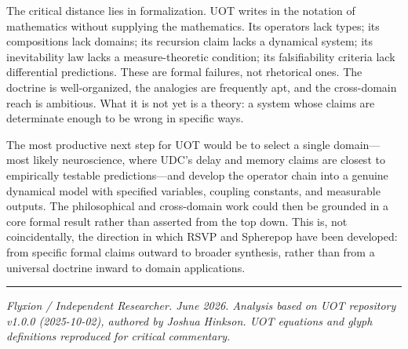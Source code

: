 \documentclass[12pt, oneside]{article}
\theoremstyle{plain-remark}
\begin{document}
The critical distance lies in formalization. UOT writes in the notation of mathematics
without supplying the mathematics. Its operators lack types; its compositions lack domains;
its recursion claim lacks a dynamical system; its inevitability law lacks a
measure-theoretic condition; its falsifiability criteria lack differential predictions.
These are formal failures, not rhetorical ones. The doctrine is well-organized, the
analogies are frequently apt, and the cross-domain reach is ambitious. What it is not
yet is a theory: a system whose claims are determinate enough to be wrong in specific ways.

The most productive next step for UOT would be to select a single domain---most likely
neuroscience, where UDC's delay and memory claims are closest to empirically testable
predictions---and develop the operator chain into a genuine dynamical model with specified
variables, coupling constants, and measurable outputs. The philosophical and cross-domain
work could then be grounded in a core formal result rather than asserted from the top down.
This is, not coincidentally, the direction in which RSVP and Spherepop have been developed:
from specific formal claims outward to broader synthesis, rather than from a universal
doctrine inward to domain applications.

\vspace{2em}
\noindent\rule{\textwidth}{0.4pt}

\vspace{0.5em}
\noindent\textit{Flyxion / Independent Researcher. June 2026.
Analysis based on UOT repository v1.0.0 (2025-10-02), authored by Joshua Hinkson.
UOT equations and glyph definitions reproduced for critical commentary.}
\end{document}
